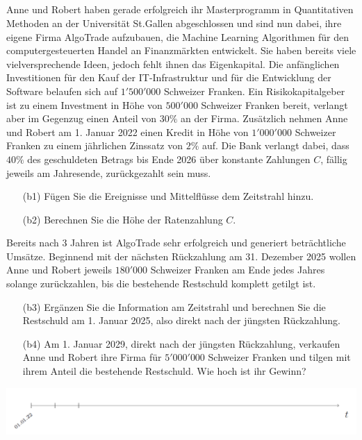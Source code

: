 \subsection*{}
Anne und Robert haben gerade erfolgreich ihr Masterprogramm in Quantitativen
Methoden an der Universität St.Gallen abgeschlossen und sind nun dabei, ihre eigene
Firma AlgoTrade aufzubauen, die Machine Learning Algorithmen für den computergesteuerten Handel an Finanzmärkten entwickelt. Sie haben bereits viele vielversprechende Ideen, jedoch fehlt ihnen das Eigenkapital. Die anfänglichen Investitionen für den Kauf der IT-Infrastruktur und für die Entwicklung der Software belaufen sich auf $1'500'000$ Schweizer Franken.
Ein Risikokapitalgeber ist zu einem Investment in Höhe von $500'000$ Schweizer Franken bereit, verlangt aber im Gegenzug einen Anteil von $30 \%$ an der Firma.
Zusätzlich nehmen Anne und Robert am 1. Januar 2022 einen Kredit in Höhe von $1'000'000$ Schweizer Franken zu einem jährlichen Zinssatz von $2 \% $ auf.
Die Bank verlangt dabei, dass $40 \%$ des geschuldeten Betrags bis Ende 2026 über konstante Zahlungen $C$, fällig jeweils am Jahresende, zurückgezahlt sein muss.
\begin{enumerate}
	\item[(b1)] Fügen Sie die Ereignisse und Mittelflüsse dem Zeitstrahl hinzu.
	\item[(b2)] Berechnen Sie die Höhe der Ratenzahlung $C$.
\end{enumerate}
Bereits nach 3 Jahren ist AlgoTrade sehr erfolgreich und generiert beträchtliche Umsätze. Beginnend mit der nächsten Rückzahlung am 31. Dezember 2025 wollen Anne und Robert jeweils $180'000$ Schweizer Franken am Ende jedes Jahres solange zurückzahlen, bis die bestehende Restschuld komplett getilgt ist.
\begin{enumerate}
	\item[(b3)] Ergänzen Sie die Information am Zeitstrahl und berechnen Sie die Restschuld am 1. Januar 2025, also direkt nach der jüngsten Rückzahlung.
	\item[(b4)] Am 1. Januar 2029, direkt nach der jüngsten Rückzahlung, verkaufen Anne und Robert	ihre Firma für $5'000'000$ Schweizer Franken und tilgen mit ihrem Anteil die bestehende	Restschuld. Wie hoch ist ihr Gewinn?
\end{enumerate}
\begin{center}
	\includegraphics[scale=0.45]{pictures/zeitstrahl_1_b}
\end{center}
